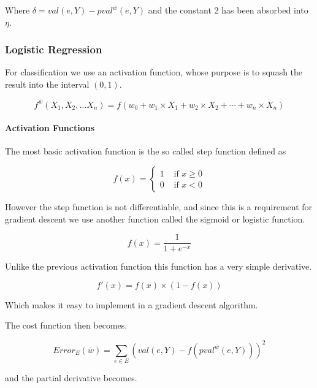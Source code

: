 Where $\delta = val(e,Y) - pval^{\overline{w}}(e,Y)$ and the constant 2 has been absorbed into $\eta$.

\begin{flushright}
\cite[p. 305]{AI2010}
\end{flushright}

\subsubsection{Logistic Regression}\label{sec:logistic}

For classification we use an activation function, whose purpose is to squash the result into the interval $(0,1)$.

\[ f^{\overline{w}}(X_1, X_2, \dots X_n) = f(w_0 + w_1 \times X_1 + w_2 \times X_2 + \cdots + w_n \times X_n) \]

\paragraph{Activation Functions}

The most basic activation function is the so called step function defined as 

\[ f(x) = \begin{cases}

	1 &\text{ if } x \geq 0 \\
	0 &\text{ if } x < 0 
\end{cases}\]

However the step function is not differentiable, and since this is a requirement for gradient descent we use another
function called the sigmoid or logistic function.

\[ f(x) = \frac{1}{1+e^{-x}} \]

Unlike the previous activation function this function has a very simple derivative.

\[ f'(x) = f(x) \times (1-f(x)) \]

Which makes it easy to implement in a gradient descent algorithm.

The cost function then becomes.

\[ Error_E(\overline{w}) = \sum_{e \in E} \left(val(e,Y)-f\left(pval^{\overline{w}}(e,Y)\right)\right)^2 \]

and the partial derivative becomes.

